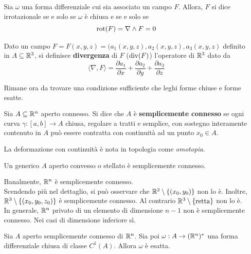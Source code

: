 \begin{definition} \label{Def: Campo irrotazionale}
    Sia $\omega$ una forma differenziale cui sia associato un campo $F$. Allora, $F$ si dice irrotazionale se e solo se $\omega$ è chiusa e se e solo se
    \begin{equation}
      \operatorname{rot}(F) = \nabla \wedge F = 0  
    \end{equation}
\end{definition}
\begin{definition} \label{Def: Divergenza}
    Dato un campo $F= F(x,y,z)= (a_1(x,y,z), a_2(x,y,z), a_3(x,y,z)$ definito in $A \subseteq \mathbb{R}^3$, si definisce \textbf{divergenza} di $F$ ($\operatorname{div}(F)$) l'operatore di $\mathbb{R}^3$ dato da
    \begin{equation}
        \langle \nabla, F \rangle = \frac{\partial a_1}{\partial x} + \frac{\partial a_2}{\partial y} + \frac{\partial a_3}{\partial z}
    \end{equation}
\end{definition}
Rimane ora da trovare una condizione sufficiente che leghi forme chiuse e forme esatte. 
\begin{definition}
    Sia $A \subseteq \mathbb{R}^n$ aperto connesso. Si dice che $A$ è \textbf{semplicemente connesso} se ogni curva $\gamma:[a,b] \to A$ chiusa, regolare a tratti e semplice, con sostegno interamente contenuto in $A$ può essere contratta con continuità ad un punto $x_0 \in A$.
\end{definition}
\begin{oss}
    La deformazione con continuità è nota in topologia come \textit{omotopia}.
\end{oss}
\begin{oss}
    Un generico $A$ aperto convesso o stellato è semplicemente connesso.
\end{oss}
\begin{example}
    Banalmente, $\mathbb{R}^n$ è semplicemente connesso.\\
    Scendendo più nel dettaglio, si può osservare che $\mathbb{R}^2 \setminus \left\{(x_0,y_0)\right\}$ non lo è.
    Inoltre, $\mathbb{R}^3 \setminus \left\{(x_0, y_0, z_0)\right\}$ è semplicemente connesso. Al contrario $\mathbb{R}^3 \setminus \left\{\text{retta}\right\}$ non lo è.\\
    In generale, $\mathbb{R}^n$ privato di un elemento di dimensione $n-1$ non è semplicemente connesso. Nei casi di dimensione inferiore sì.
\end{example}
\begin{theorem} \label{Teo: Forma chiusa => forma esatta in spazi semplicemente connessi}
    Sia $A$ aperto semplicemente connesso di $\mathbb{R}^n$. Sia poi $\omega: A \to (\mathbb{R}^n)^*$ una forma differenziale chiusa di classe $C^1(A)$. Allora $\omega$ è esatta.
\end{theorem}
